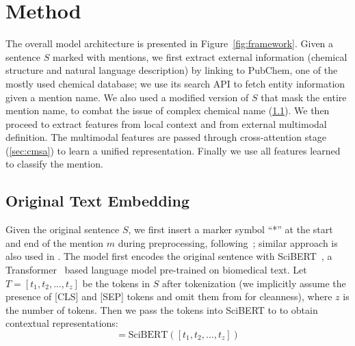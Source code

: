 

\section{Method}
\label{sec:method}

The overall model architecture is presented in Figure~\ref{fig:framework}. Given a sentence $S$ marked with mentions, we first extract external information (chemical structure and natural language description) by linking to PubChem, one of the mostly used chemical database; we use its search API to fetch entity information given a mention name. We also used a modified version of $S$ that mask the entire mention name, to combat the issue of complex chemical name (\ref{sec:context}). We then proceed to extract features from local context and from external multimodal definition. The multimodal features are passed through cross-attention stage (\ref{sec:cmsa}) to learn a unified representation. Finally we use all features learned to classify the mention.




\subsection{Original Text Embedding}
\label{sec:context}

Given the original sentence $S$, we first insert a marker symbol ``*'' at the start and end of the mention $m$ during preprocessing, following~\cite{atlop}; similar approach is also used in \cite{marker1, marker2}. The model first encodes the original sentence with SciBERT~\cite{scibert}, a Transformer~\cite{transformer} based language model pre-trained on biomedical text. Let $T=[t_1, t_2, ..., t_z]$ be the tokens in $S$ after tokenization (we implicitly assume the presence of [CLS] and [SEP] tokens and omit them from for cleanness), where $z$ is the number of tokens. Then we pass the tokens into SciBERT to to obtain contextual representations:
\begin{equation}
[\mathbf{t}_1, \mathbf{t}_2, ..., \mathbf{t}_z]=\text{SciBERT}([t_1, t_2, ..., t_z])\end{equation}


